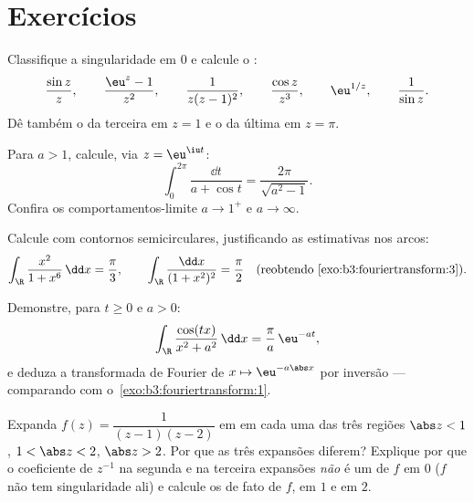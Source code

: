 \section{Exercícios}

\begin{exercise}[$\star$]\label{exo:b3:residues:1}
Classifique a singularidade em $0$ e calcule o :
\[
\frac{\sin z}{z},\qquad
\frac{\eu^z - 1}{z^2},\qquad
\frac{1}{z(z-1)^2},\qquad
\frac{\cos z}{z^3},\qquad
\eu^{1/z},\qquad
\frac1{\sin z} .
\]
Dê também o  da terceira em $z = 1$ e o da última em $z = \pi$.
\end{exercise}

\begin{exercise}[$\star$]\label{exo:b3:residues:2}
Para $a > 1$, calcule, via $z = \eu^{\iu t}$:
\[
\int_0^{2\pi}\frac{\dd t}{a + \cos t}
= \frac{2\pi}{\sqrt{a^2 - 1}} .
\]
Confira os comportamentos-limite $a \to 1^+$ e $a \to \infty$.
\end{exercise}

\begin{exercise}[$\star\star$]\label{exo:b3:residues:3}
Calcule com contornos semicirculares, justificando as estimativas nos
arcos:
\[
\int_\R\frac{x^2}{1 + x^6}\,\dd x = \frac\pi3,
\qquad
\int_\R\frac{\dd x}{(1 + x^2)^{2}} = \frac\pi2
\quad\text{(reobtendo \cref{exo:b3:fouriertransform:3})}.
\]
\end{exercise}

\begin{exercise}[$\star\star$]\label{exo:b3:residues:4}
Demonstre, para $t \geq 0$ e $a > 0$:
\[
\int_\R\frac{\cos(tx)}{x^2 + a^2}\,\dd x =
\frac{\pi}{a}\,\eu^{-at},
\]
e deduza a transformada de Fourier de $x \mapsto \eu^{-a\abs
x}$ por inversão --- comparando
com o~\cref{exo:b3:fouriertransform:1}.
\end{exercise}

\begin{exercise}[$\star\star$]\label{exo:b3:residues:5}
Expanda $f(z) = \dfrac1{(z-1)(z-2)}$ em  em cada uma das três regiões $\abs z < 1$,
$1 < \abs z < 2$, $\abs z >
2$. Por que as três expansões diferem? Explique por que o
coeficiente de $z^{-1}$ na segunda e na terceira expansões
\emph{não} é um  de $f$ em $0$ ($f$ não tem
singularidade ali) e calcule os  de fato de $f$, em $1$
e em $2$.
\end{exercise}

